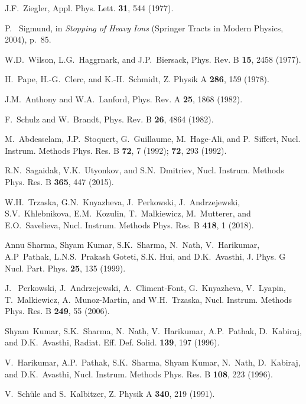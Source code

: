 \documentclass[aps,pra,twocolumn,amsmath,amssymb,floatfix]{revtex4-2}
\begin{document}
\begin{thebibliography}{99}
 J.F.~Ziegler,
 Appl. Phys. Lett. \textbf{31}, 544 (1977).

 P.~ Sigmund,
 in \textit{Stopping of Heavy Ions} (Springer Tracts in Modern Physics, 2004), p.~85.

  W.D.~Wilson, L.G.~Haggrnark, and J.P.~Biersack,
  Phys. Rev. B \textbf{15}, 2458 (1977).

 H.~Pape, H.-G.~Clerc, and K.-H.~Schmidt,
 Z. Physik A \textbf{286}, 159 (1978).

 J.M.~Anthony and W.A.~Lanford,
 Phys. Rev. A \textbf{25}, 1868 (1982).

 F.~Schulz and W.~Brandt,
 Phys. Rev. B \textbf{26}, 4864 (1982).

 M.~Abdesselam, J.P.~Stoquert, G.~Guillaume, M.~Hage-Ali, and P.~Siffert,
 Nucl. Instrum. Methods Phys. Res. B \textbf{72}, 7 (1992); \textbf{72}, 293 (1992).

 R.N.~Sagaidak, V.K.~Utyonkov, and S.N.~Dmitriev,
 Nucl. Instrum. Methods Phys. Res. B \textbf{365}, 447 (2015).

 W.H.~Trzaska, G.N.~Knyazheva, J.~Perkowski, J.~Andrzejewski, S.V.~Khlebnikova, E.M.~Kozulin, T.~Malkiewicz, M.~Mutterer, and E.O.~Savelieva,
 Nucl. Instrum. Methods Phys. Res. B \textbf{418}, 1 (2018).

 Annu Sharma, Shyam Kumar, S.K.~Sharma, N.~Nath, V.~Harikumar, A.P~Pathak, L.N.S.~Prakash Goteti, S.K. Hui, and D.K.~Avasthi,
 J. Phys. G Nucl. Part. Phys. \textbf{25}, 135 (1999).

 J.~ Perkowski, J.~Andrzejewski, A.~Climent-Font, G.~Knya\-zheva, V.~Lyapin, T.~Malkiewicz, A.~Munoz-Martin, and W.H.~Trzaska,
 Nucl. Instrum. Methods Phys. Res. B \textbf{249}, 55 (2006).

 Shyam~Kumar, S.K.~Sharma, N.~Nath, V.~Harikumar, A.P.~Pathak, D.~Kabiraj, and D.K.~Avasthi,
 Radiat. Eff. Def. Solid. \textbf{139}, 197 (1996).

 V.~Harikumar, A.P.~Pathak, S.K.~Sharma, Shyam Kumar, N.~Nath, D.~Kabiraj, and D.K.~Avasthi,
 Nucl. Instrum. Methods Phys. Res. B \textbf{108}, 223 (1996).

 V.~Sch\"{u}le and S.~Kalbitzer,
 Z. Physik A \textbf{340}, 219 (1991).


\end{thebibliography}
\end{document}
